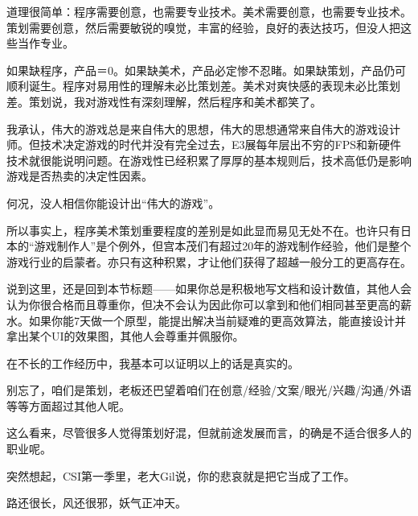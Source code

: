 \documentclass{article}
\begin{document}
道理很简单：程序需要创意，也需要专业技术。美术需要创意，也需要专业技术。策划需要创意，然后需要敏锐的嗅觉，丰富的经验，良好的表达技巧，但没人把这些当作专业。



如果缺程序，产品＝0。如果缺美术，产品必定惨不忍睹。如果缺策划，产品仍可顺利诞生。程序对易用性的理解未必比策划差。美术对爽快感的表现未必比策划差。策划说，我对游戏性有深刻理解，然后程序和美术都笑了。



我承认，伟大的游戏总是来自伟大的思想，伟大的思想通常来自伟大的游戏设计师。但技术决定游戏的时代并没有完全过去，E3展每年层出不穷的FPS和新硬件技术就很能说明问题。在游戏性已经积累了厚厚的基本规则后，技术高低仍是影响游戏是否热卖的决定性因素。



何况，没人相信你能设计出“伟大的游戏”。



所以事实上，程序美术策划重要程度的差别是如此显而易见无处不在。也许只有日本的“游戏制作人”是个例外，但宫本茂们有超过20年的游戏制作经验，他们是整个游戏行业的启蒙者。亦只有这种积累，才让他们获得了超越一般分工的更高存在。



说到这里，还是回到本节标题——如果你总是积极地写文档和设计数值，其他人会认为你很合格而且尊重你，但决不会认为因此你可以拿到和他们相同甚至更高的薪水。如果你能7天做一个原型，能提出解决当前疑难的更高效算法，能直接设计并拿出某个UI的效果图，其他人会尊重并佩服你。



在不长的工作经历中，我基本可以证明以上的话是真实的。



别忘了，咱们是策划，老板还巴望着咱们在创意/经验/文案/眼光/兴趣/沟通/外语等等方面超过其他人呢。



这么看来，尽管很多人觉得策划好混，但就前途发展而言，的确是不适合很多人的职业呢。



突然想起，CSI第一季里，老大Gil说，你的悲哀就是把它当成了工作。



路还很长，风还很邪，妖气正冲天。
\end{document}
